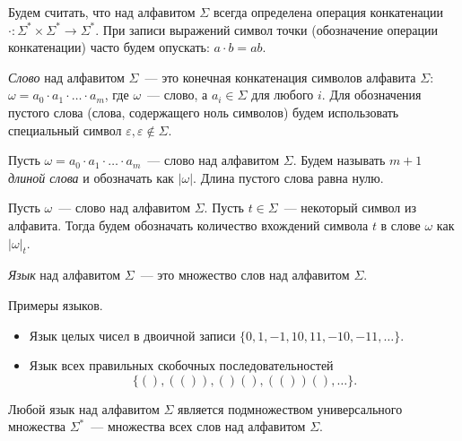 Будем считать, что над алфавитом $\Sigma$ всегда определена операция конкатенации $\cdot: \Sigma^* \times \Sigma^* \to \Sigma^*$.
При записи выражений символ точки (обозначение операции конкатенации) часто будем опускать: $a \cdot b = ab$.

\begin{definition}[Слово]
    \emph{Слово} над алфавитом $\Sigma$~--- это конечная конкатенация символов алфавита $\Sigma$: $\omega = a_0 \cdot a_1 \cdot \dots \cdot a_m$, где $\omega$~--- слово, а $a_i \in \Sigma$ для любого $i$.
    Для обозначения пустого слова (слова, содержащего ноль символов) будем использовать специальный символ $\varepsilon, \varepsilon \notin \Sigma$.
\end{definition}

\begin{definition}
    Пусть $\omega = a_0 \cdot a_1 \cdot \dots \cdot a_m$~--- слово над алфавитом $\Sigma$.
    Будем называть $m + 1$ \emph{длиной слова} и обозначать как $|\omega|$.
    Длина пустого слова равна нулю.
\end{definition}

\begin{definition}
    Пусть $\omega$~--- слово над алфавитом $\Sigma$. Пусть $t \in \Sigma$~--- некоторый символ из алфавита.
    Тогда будем обозначать количество вхождений символа $t$ в слове $\omega$ как $|\omega|_t$.
\end{definition}

\begin{definition}[Язык]
    \emph{Язык} над алфавитом $\Sigma$~--- это множество слов над алфавитом $\Sigma$.
\end{definition}

\begin{example}
    Примеры языков.

    \begin{itemize}
        \item Язык целых чисел в двоичной записи $\{0, 1, -1, 10, 11, -10, -11, \dots\}$.
        \item Язык всех правильных скобочных последовательностей
              \[\{(), (()), ()(), (())(), \dots\}.\]
    \end{itemize}
\end{example}

Любой язык над алфавитом $\Sigma$ является подмножеством универсального множества $\Sigma^*$~--- множества всех слов над алфавитом $\Sigma$.

